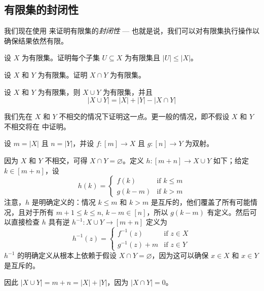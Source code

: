 \subsection*{有限集的封闭性}

我们现在使用  来证明有限集的\textit{封闭性} --- 也就是说，我们可以对有限集执行操作以确保结果依然有限。

\begin{exercise}
设 $X$ 为有限集。证明每个子集 $U \subseteq X$ 为有限集且 $|U| \le |X|$。
\end{exercise}

\begin{exercise}
设 $X$ 和 $Y$ 为有限集。证明 $X \cap Y$ 为有限集。
\end{exercise}

\begin{proposition}
\label{propUnionOfFiniteSetsIsFinite}
设 $X$ 和 $Y$ 为有限集，则 $X \cup Y$ 为有限集，并且
\[ |X \cup Y| = |X| + |Y| - |X \cap Y| \]
\end{proposition}

\begin{cproof}
我们先在 $X$ 和 $Y$ 不相交的情况下证明这一点。更一般的情况，即不假设 $X$ 和 $Y$ 不相交将在  中证明。

设 $m = |X|$ 且 $n=|Y|$，并设 $f : [m] \to X$ 且 $g : [n] \to Y$ 为双射。
 
因为 $X$ 和 $Y$ 不相交，可得 $X \cap Y = \varnothing$。定义 $h : [m+n] \to X \cup Y$ 如下；给定 $k \in [m+n]$，设
\[ h(k) = \begin{cases} f(k) & \text{if } k \le m \\ g(k-m) & \text{if } k > m \end{cases} \]
注意，$h$ 是明确定义的：情况 $k \le m$ 和 $k > m$ 是互斥的，他们覆盖了所有可能情况，且对于所有 $m+1 \le k \le n$, $k-m \in [n]$，所以 $g(k-m)$ 有定义。然后可以直接检查 $h$ 具有逆 $h^{-1} : X \cup Y \to [m+n]$ 定义为
\[ h^{-1}(z) = \begin{cases} f^{-1}(z) & \text{if } z \in X \\ g^{-1}(z)+m & \text{if } z \in Y \end{cases} \]
$h^{-1}$ 的明确定义从根本上依赖于假设 $X \cap Y = \varnothing$，因为这可以确保 $x \in X$ 和 $x \in Y$ 是互斥的。

因此 $|X \cup Y| = m+n = |X| + |Y|$，因为 $|X \cap Y| = 0$。
\end{cproof}

